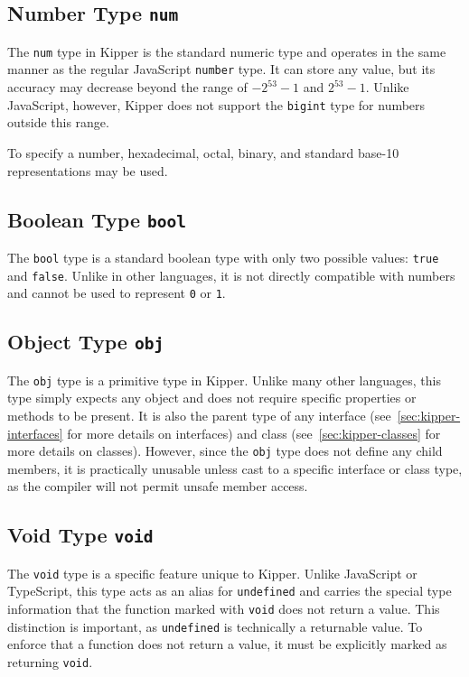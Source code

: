 \subsection{Number Type \lstinline|num|}

The \lstinline|num| type in Kipper is the standard numeric type and operates in the same manner as the regular JavaScript \lstinline|number| type. It can store any value, but its accuracy may decrease beyond the range of \(-2^{53} - 1\) and \(2^{53} - 1\). Unlike JavaScript, however, Kipper does not support the \lstinline|bigint| type for numbers outside this range.

To specify a number, hexadecimal, octal, binary, and standard base-10 representations may be used.

\subsection{Boolean Type \lstinline|bool|}

The \lstinline|bool| type is a standard boolean type with only two possible values: \lstinline|true| and \lstinline|false|. Unlike in other languages, it is not directly compatible with numbers and cannot be used to represent \lstinline|0| or \lstinline|1|.

\subsection{Object Type \lstinline|obj|}

The \lstinline|obj| type is a primitive type in Kipper. Unlike many other languages, this type simply expects any object and does not require specific properties or methods to be present. It is also the parent type of any interface (see~\ref{sec:kipper-interfaces} for more details on interfaces) and class (see~\ref{sec:kipper-classes} for more details on classes). However, since the \lstinline|obj| type does not define any child members, it is practically unusable unless cast to a specific interface or class type, as the compiler will not permit unsafe member access.

\subsection{Void Type \lstinline|void|}

The \lstinline|void| type is a specific feature unique to Kipper. Unlike JavaScript or TypeScript, this type acts as an alias for \lstinline|undefined| and carries the special type information that the function marked with \lstinline|void| does not return a value. This distinction is important, as \lstinline|undefined| is technically a returnable value. To enforce that a function does not return a value, it must be explicitly marked as returning \lstinline|void|.

